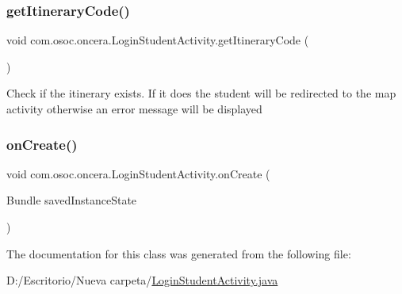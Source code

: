 \subsubsection{\texorpdfstring{getItineraryCode()}{getItineraryCode()}}
{\footnotesize\ttfamily void com.\+osoc.\+oncera.\+Login\+Student\+Activity.\+get\+Itinerary\+Code (\begin{DoxyParamCaption}{ }\end{DoxyParamCaption})}

Check if the itinerary exists. If it does the student will be redirected to the map activity otherwise an error message will be displayed \mbox{\label{classcom_1_1osoc_1_1oncera_1_1_login_student_activity_a850567ad9113c6e66049f0c1d875723c}} 
\subsubsection{\texorpdfstring{onCreate()}{onCreate()}}
{\footnotesize\ttfamily void com.\+osoc.\+oncera.\+Login\+Student\+Activity.\+on\+Create (\begin{DoxyParamCaption}\item[{Bundle}]{saved\+Instance\+State }\end{DoxyParamCaption})\hspace{0.3cm}{\ttfamily [protected]}}



The documentation for this class was generated from the following file\+:\begin{DoxyCompactItemize}
\item 
D\+:/\+Escritorio/\+Nueva carpeta/\mbox{\hyperlink{_login_student_activity_8java}{Login\+Student\+Activity.\+java}}\end{DoxyCompactItemize}
